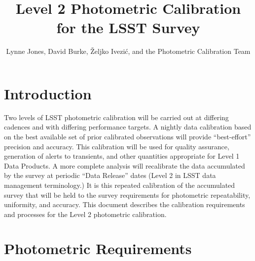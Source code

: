 \documentclass[12pt,preprint]{aastex}
\begin{document}
\title{Level 2 Photometric Calibration for the LSST Survey}

\author{
Lynne Jones, David Burke, \v{Z}eljko Ivezi\'{c}, and the Photometric Calibration Team
}



\section{Introduction}


Two levels of LSST photometric calibration will be carried out at
differing cadences and with differing performance targets. A nightly
data calibration based on the best available set of prior calibrated
observations will provide “best-effort” precision and accuracy. This
calibration will be used for quality assurance, generation of alerts
to transients, and other quantities appropriate for Level 1 Data
Products.  A more complete analysis will recalibrate the data
accumulated by the survey at periodic “Data Release” dates (Level 2 in
LSST data management terminology.)  It is this repeated calibration of
the accumulated survey that will be held to the survey requirements
for photometric repeatability, uniformity, and accuracy.  This
document describes the calibration requirements and processes for the
Level 2 photometric calibration.

\section{Photometric Requirements}
\end{document}
